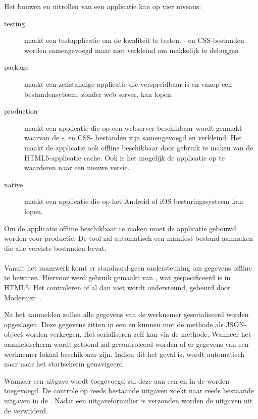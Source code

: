 Het bouwen en uitrollen van een applicatie kan op vier niveaus:
\begin{description}
  \item [testing] maakt een testapplicatie om de kwaliteit te testen.  \js- en CSS-bestanden worden samengevoegd maar niet verkleind om makkelijk te debuggen
  \item [package] maakt een zelfstandige applicatie die verspreidbaar is en vanop een bestandensyteem,  zonder web server,  kan lopen.
  \item [production] maakt een applicatie die op een webserver beschikbaar wordt gemaakt waarvan de \js-, en CSS- bestanden zijn samengevoegd en verkleind.  Het maakt de applicatie ook offline beschikbaar door gebruik te maken van de HTML5-applicatie cache.  Ook is het mogelijk de applicatie op te waarderen naar een nieuwe versie.
  \item [native] maakt een  applicatie die op het Android of iOS besturingssysteem kan lopen.
\end{description}
Om de applicatie offline beschikbaar te maken moet de applicatie gebouwd worden voor productie.
De tool zal automatisch een manifest bestand aanmaken die alle vereiste bestanden bevat.

\paragraph{\kendo}
Vanuit het raamwerk komt er standaard geen ondersteuning om gegevens offline te bewaren.
Hiervoor werd gebruik gemaakt van , wat gespecificeerd is in HTML5.
Het controleren of  al dan niet wordt ondersteund, gebeurd door Modernizr~\cite{Modernizr2012}.

Na het aanmelden zullen alle gegevens van de werknemer geserialiseerd worden opgeslagen.
Deze gegevens zitten in een  en kunnen met de  methode als JSON-object worden verkregen.
Het serialiseren zelf kan via de  methode.
Wanneer het aanmeldscherm wordt getoond zal gecontroleerd worden of er gegevens van een werknemer lokaal beschikbaar zijn.
Indien dit het geval is, wordt automatisch naar naar het startscherm genavigeerd.

Wanneer een uitgave wordt toegevoegd zal deze aan een  en in de  worden toegevoegd.
De controle op reeds bestaande uitgaven zoekt naar reeds bestaande uitgaven in de .
Nadat een uitgaveformulier is verzonden worden de uitgaven uit de  verwijderd.

